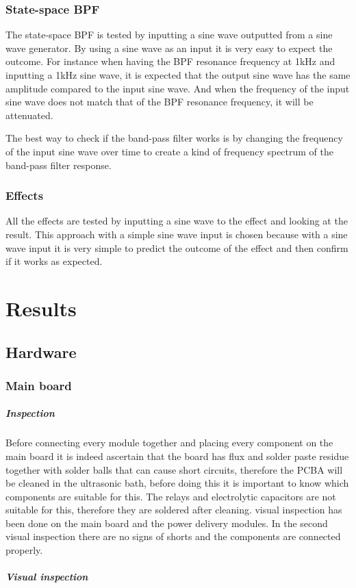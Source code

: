 \subsubsection{State-space BPF}
The state-space BPF is tested by inputting a sine wave outputted from a sine wave generator. By using a sine wave as an input it is very easy to expect the outcome. For instance when having the BPF resonance frequency at 1kHz and inputting a 1kHz sine wave, it is expected that the output sine wave has the same amplitude compared to the input sine wave. And when the frequency of the input sine wave does not match that of the BPF resonance frequency, it will be attenuated. 

The best way to check if the band-pass filter works is by changing the frequency of the input sine wave over time to create a kind of frequency spectrum of the band-pass filter response. 

\subsubsection{Effects}
All the effects are tested by inputting a sine wave to the effect and looking at the result. This approach with a simple sine wave input is chosen because with a sine wave input it is very simple to predict the outcome of the effect and then confirm if it works as expected.

\section{Results}

\subsection{Hardware}

\subsubsection{Main board}
\subparagraph{Inspection} Before connecting every module together and placing every component on the main board it is indeed ascertain that the board has flux and solder paste residue together with solder balls that can cause short circuits, therefore the PCBA will be cleaned in the ultrasonic bath, before doing this it is important to know which components are suitable for this. The relays and electrolytic capacitors are not suitable for this, therefore they are soldered after cleaning.  visual inspection has been done on the main board and the power delivery modules. In the second visual inspection there are no signs of shorts and the components are connected properly.
\subparagraph{Visual inspection} 

